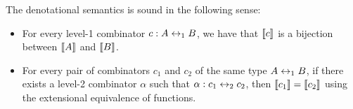 

\begin{theorem}\label{thm:semone}
  The denotational semantics is sound in the following sense:
  \begin{itemize}
    \item For every level-1 combinator $c : A \leftrightarrow_1 B$, we have that $\llbracket c\rrbracket$ is a bijection between $\llbracket A\rrbracket$ and $\llbracket B\rrbracket$.
      \item For every pair of combinators $c_1$ and $c_2$ of the same type $A \leftrightarrow_1 B$, if there exists a level-2
        combinator $\alpha$ such that $\alpha : c_1 \leftrightarrow_2 c_2$, then $\llbracket c_1\rrbracket = \llbracket c_2\rrbracket$ using the
        extensional equivalence of functions.
  \end{itemize}
\end{theorem}


